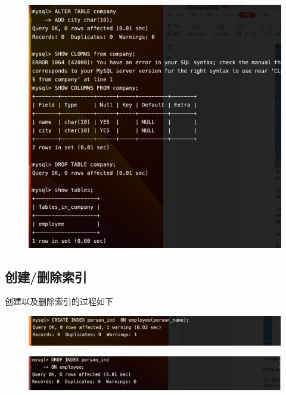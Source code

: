 \documentclass{article}
\begin{document}
\begin{figure}[H]
    \centering
    \includegraphics[width=1\textwidth]{lab2/2.png}
    \end{figure}


\subsection*{创建/删除索引}

创建以及删除索引的过程如下

\begin{figure}[H]
    \centering
    \includegraphics[width=1\textwidth]{lab2/3.png}
    \end{figure}


    \begin{figure}[H]
        \centering
        \includegraphics[width=1\textwidth]{lab2/4.png}
        \end{figure}
\end{document}
